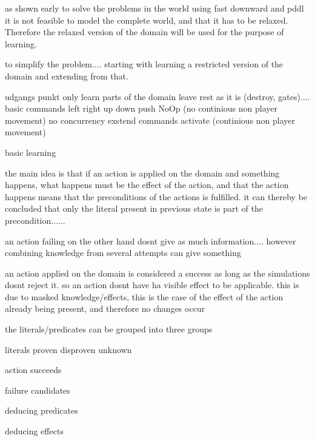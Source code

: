 	
	
	
	as shown early to solve the problems in the world using fast downward and pddl it is not feasible to model the complete world, and that it has to be relaxed. Therefore the relaxed version of the domain will be used for the purpose of learning.
	
	
	to simplify the problem.... starting with learning a restricted version of the domain and extending from that.
	
	udgangs punkt
	only learn parts of the domain leave rest as it is (destroy, gates)....
	basic 
		commands left right up down push NoOp  (no continious non player movement)
		no concurrency
	exstend commands activate  (continious non player movement)
	
	




basic learning
		
	the main idea is that if an action is applied on the domain and something happens, what happens must be the effect of the action, and that the action happens means that the preconditions of the actions is fulfilled.
	it can thereby be concluded that only the literal present in previous state is part of the precondition......
	
	an action failing on the other hand dosnt give as much information.... however combining knowledge from several attempts can give something
	
	an action applied on the domain is considered a success as long as the simulations dosnt reject it. so an action dosnt have ha visible effect to be applicable. this is due to masked knowledge/effects, this is the case of the effect of the action already being present, and therefore no changes occur

	
	the literals/predicates can be grouped into three groups

		
	literals
		proven
		disproven
		unknown
		
	action 	
		succeeds
			
		failure
			candidates
	
	
	deducing predicates
	
	deducing effects
	
	
